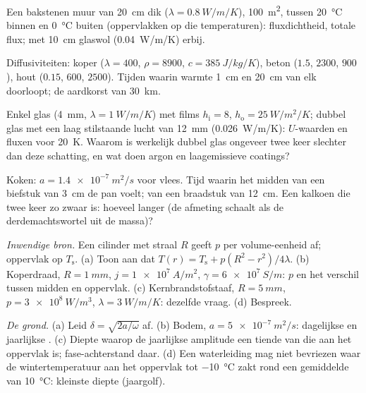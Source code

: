 \begin{exercise}[$\star$]\label{exo:b2:heat-conduction:1}
Een bakstenen muur van \qty{20}{cm} dik ($\lambda = \qty{0.8}{W/m/K}$),
\qty{100}{m^2},
tussen \qty{20}{\celsius} binnen en \qty{0}{\celsius} buiten
(oppervlakken op die temperaturen): fluxdichtheid, totale flux; met
\qty{10}{cm} glaswol (\qty{0.04}{W/m/K}) erbij.
\end{exercise}

\begin{exercise}[$\star$]\label{exo:b2:heat-conduction:2}
Diffusiviteiten: koper ($\lambda = 400$, $\rho = 8900$, $c = \qty{385}{J/kg/K}$),
beton ($1.5$, $2300$, $900$), hout ($0.15$, $600$, $2500$). Tijden waarin warmte
\qty{1}{cm} en \qty{20}{cm} van elk doorloopt; de aardkorst van \qty{30}{km}.
\end{exercise}

\begin{exercise}[$\star$]\label{exo:b2:heat-conduction:3}
Enkel glas (\qty{4}{mm}, $\lambda = \qty{1}{W/m/K}$) met films
$h_{\text{i}}
= 8$, $h_{\text{o}} = \qty{25}{W/m^2/K}$; dubbel glas met een
laag
stilstaande lucht van \qty{12}{mm} (\qty{0.026}{W/m/K}): $U$-waarden en fluxen voor
\qty{20}{K}. Waarom is werkelijk dubbel glas ongeveer twee keer slechter dan deze
schatting, en wat doen argon en laagemissieve coatings?
\end{exercise}

\begin{exercise}[$\star$]\label{exo:b2:heat-conduction:4}
Koken: $a = \qty{1.4e-7}{m^2/s}$ voor vlees. Tijd waarin het midden van een
biefstuk van \qty{3}{cm} de pan voelt; van een braadstuk van \qty{12}{cm}.
Een kalkoen
die twee keer zo zwaar is: hoeveel langer (de afmeting schaalt als de
derdemachtswortel
uit de massa)?
\end{exercise}

\begin{exercise}[$\star\star$]\label{exo:b2:heat-conduction:5}
\emph{Inwendige bron.} Een cilinder met straal $R$ geeft $p$ per volume-eenheid
af; oppervlak op $T_{\text{s}}$. (a) Toon aan dat
$T(r) = T_{\text{s}} +
p(R^2 - r^2)/4\lambda$. (b) Koperdraad,
$R = \qty{1}{mm}$, $j =
\qty{1e7}{A/m^2}$, $\gamma = \qty{6e7}{S/m}$: $p$ en
het verschil tussen midden
en oppervlak. (c) Kernbrandstofstaaf, $R = \qty{5}{mm}$, $p = \qty{3e8}{W/m^3}$,
$\lambda = \qty{3}{W/m/K}$: dezelfde vraag. (d) Bespreek.
\end{exercise}

\begin{exercise}[$\star\star$]\label{exo:b2:heat-conduction:6}
\emph{De grond.} (a) Leid $\delta = \sqrt{2a/\omega}$ af. (b) Bodem,
$a = \qty{5e-7}{m^2/s}$: dagelijkse en jaarlijkse . (c) Diepte
waarop de jaarlijkse amplitude een tiende van die aan het oppervlak is;
fase-achterstand
daar. (d) Een waterleiding mag niet bevriezen waar de wintertemperatuur aan
het oppervlak
tot \qty{-10}{\celsius} zakt rond een gemiddelde van
\qty{10}{\celsius}: kleinste diepte (jaargolf).
\end{exercise}

